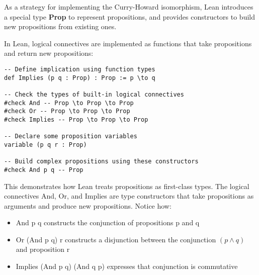 As a strategy for implementing the Curry-Howard isomorphism, Lean introduces a special type \textbf{Prop} to represent propositions, and provides constructors to build new propositions from existing ones.

\begin{example}
In Lean, logical connectives are implemented as functions that take propositions and return new propositions:

\begin{lstlisting}[language=Lean]
-- Define implication using function types
def Implies (p q : Prop) : Prop := p \to q

-- Check the types of built-in logical connectives
#check And -- Prop \to Prop \to Prop
#check Or -- Prop \to Prop \to Prop
#check Implies -- Prop \to Prop \to Prop

-- Declare some proposition variables
variable (p q r : Prop)

-- Build complex propositions using these constructors
#check And p q -- Prop
\end{lstlisting}

This demonstrates how Lean treats propositions as first-class types. The logical connectives And, Or, and Implies are type constructors that take propositions as arguments and produce new propositions. Notice how:

\begin{itemize}
\item And p q constructs the conjunction of propositions p and q
\item Or (And p q) r constructs a disjunction between the conjunction $(p \land q)$ and proposition r
\item Implies (And p q) (And q p) expresses that conjunction is commutative
\end{itemize}

\end{example}
